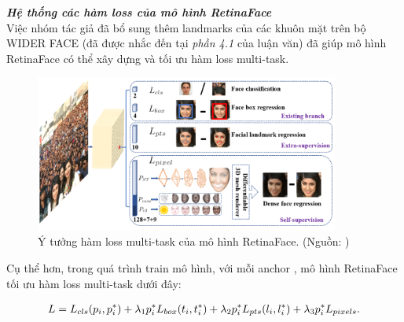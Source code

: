 {    \noindent
    \textbf{\textit{Hệ thống các hàm loss của mô hình RetinaFace}} \\
    Việc nhóm tác giả đã bổ sung thêm landmarks của các khuôn mặt trên bộ WIDER FACE (đã được nhắc đến tại \textit{phần 4.1} của luận văn) đã giúp mô hình RetinaFace có thể xây dựng và tối ưu hàm loss multi-task.

    \begin{figure}[H]
        \centering
        \includegraphics[width=10cm] {images/retinaface_loss_funcs}
        \caption{Ý tưởng hàm loss multi-task của mô hình RetinaFace. (Nguồn: \cite{deng2020retinaface})}
        \label{fig:retinaface_loss_funcs}
    \end{figure}

    Cụ thể hơn, trong quá trình train mô hình, với mỗi anchor , mô hình RetinaFace tối ưu hàm loss multi-task dưới đây:

    \begin{equation}
        \begin{split}
        L  & =  L_{cls}(p_i, p^{*}_i) + \lambda_1 p^{*}_i L_{box}(t_i, t^{*}_i) + \lambda_2 p^{*}_i L_{pts} (l_i, l^{*}_i) + \lambda_3 p^{*}_i L_{pixels \index{pixels}}.\\
        \end{split}
        \label{eq:retinaface_loss}
    \end{equation}

}
